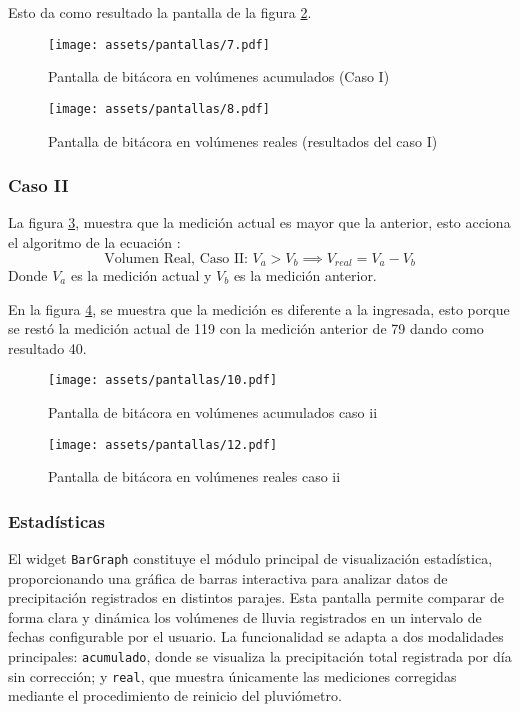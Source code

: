 Esto da como resultado la pantalla de la figura \ref{pantallas8}.

\begin{figure}[h!]
\centering
  \texttt{[image: assets/pantallas/7.pdf]}
  \caption{Pantalla de bitácora en volúmenes acumulados (Caso I)}
  \label{pantallas7}
\end{figure}


\begin{figure}[h!]
\centering
  \texttt{[image: assets/pantallas/8.pdf]}
  \caption{Pantalla de bitácora en volúmenes reales (resultados del caso I)}
  \label{pantallas8}
\end{figure}

\subsubsection*{Caso II}
La figura \ref{pantallas10}, muestra que la medición actual es mayor que la anterior, esto acciona el algoritmo de la ecuación :
\begin{equation}
\text{Volumen Real, Caso II: } V_{a}>V_{b}\implies V_{real} = V_{a} - V_{b}
\label{eq2}
\end{equation}
Donde $V_{a}$ es la medición actual y $V_{b}$ es la medición anterior.

En la figura \ref{pantallas11}, se muestra que la medición es diferente a la ingresada, esto porque se restó la medición actual de 119 con la medición anterior de 79 dando como resultado 40.


\begin{figure}[h!]
\centering
  \texttt{[image: assets/pantallas/10.pdf]}
  \caption{Pantalla de bitácora en volúmenes acumulados caso ii}
  \label{pantallas10}
\end{figure}


\begin{figure}[h!]
\centering
  \texttt{[image: assets/pantallas/12.pdf]}
  \caption{Pantalla de bitácora en volúmenes reales caso ii}
  \label{pantallas11}
\end{figure}






\newpage
\subsubsection{Estadísticas} 

El widget \texttt{BarGraph} constituye el módulo principal de visualización estadística, proporcionando una gráfica de barras interactiva para analizar datos de precipitación registrados en distintos parajes. Esta pantalla permite comparar de forma clara y dinámica los volúmenes de lluvia registrados en un intervalo de fechas configurable por el usuario. La funcionalidad se adapta a dos modalidades principales: \texttt{acumulado}, donde se visualiza la precipitación total registrada por día sin corrección; y \texttt{real}, que muestra únicamente las mediciones corregidas mediante el procedimiento de reinicio del pluviómetro. 

